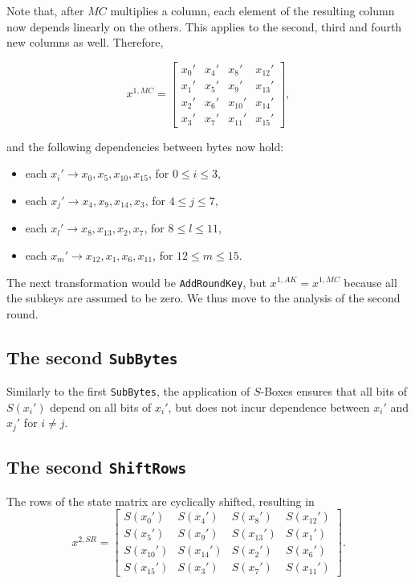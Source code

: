 \documentclass{report}
\begin{document}
Note that, after $MC$ multiplies a column, each element of the resulting column now depends linearly on the others. This applies to the second, third and fourth new columns as well. Therefore,

\begin{equation*}
x^{1, MC} =
\begin{bmatrix}
x_0' & x_4' & x_8' & x_{12}'\\
x_1' & x_5' & x_9' & x_{13}'\\
x_2' & x_6' & x_{10}' & x_{14}'\\
x_3' & x_7' & x_{11}' & x_{15}'
\end{bmatrix},
\end{equation*}

and the following dependencies between bytes now hold:

\begin{itemize}
    \item each $x_i'\rightarrow x_0, x_5, x_{10}, x_{15}$, for $0 \leq i \leq 3$,
    \item each $x_j'\rightarrow x_4, x_9, x_{14}, x_{3}$, for $4 \leq j \leq 7$,
    \item each $x_l'\rightarrow x_8, x_{13}, x_{2}, x_{7}$, for $8 \leq l \leq 11$,
    \item each $x_m'\rightarrow x_{12}, x_{1}, x_{6}, x_{11}$, for $12 \leq m \leq 15$.
\end{itemize}

The next transformation would be \texttt{AddRoundKey}, but $x^{1, AK} = x^{1, MC}$ because all the subkeys are assumed to be zero. We thus move to the analysis of the second round.

\subsection{The second \texttt{SubBytes}}
Similarly to the first \texttt{SubBytes}, the application of $S$-Boxes ensures that all bits of $S(x_i')$ depend on all bits of $x_i'$, but does not incur dependence between $x_i'$ and $x_j'$ for $i \neq j$.

\subsection{The second \texttt{ShiftRows}}
The rows of the state matrix are cyclically shifted, resulting in
\begin{equation*}
x^{2, SR} =
\begin{bmatrix}
S(x_0') & S(x_4') & S(x_8') & S(x_{12}')\\
S(x_5') & S(x_9') & S(x_{13}') & S(x_{1}')\\
S(x_{10}') & S(x_{14}') & S(x_{2}') & S(x_{6}')\\
S(x_{15}') & S(x_3') & S(x_{7}') & S(x_{11}')
\end{bmatrix}.
\end{equation*}
\end{document}

